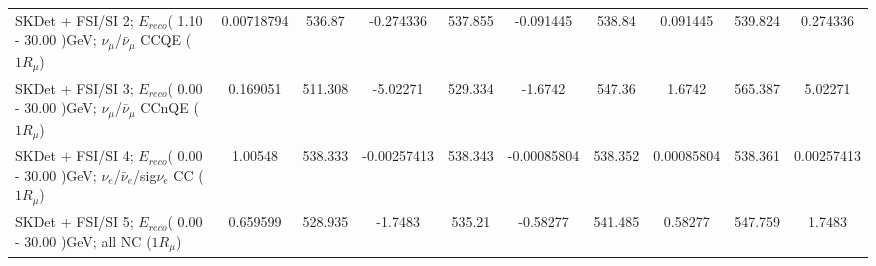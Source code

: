 \documentclass{standalone}
\begin{document}
\begin{tabular}{| l | S | S  S | S  S | S  S | S  S | }
SKDet + FSI/SI  2; $E_{reco}$( 1.10 - 30.00 )GeV; $\nu_{\mu}$/$\bar{\nu}_{\mu}$ CCQE ($1R_{\mu}$) &      0.00718794 &          536.87 &       -0.274336 &         537.855 &       -0.091445 &          538.84 &        0.091445 &         539.824 &        0.274336 \\ 
SKDet + FSI/SI  3; $E_{reco}$( 0.00 - 30.00 )GeV; $\nu_{\mu}$/$\bar{\nu}_{\mu}$ CCnQE ($1R_{\mu}$) &        0.169051 &         511.308 &        -5.02271 &         529.334 &         -1.6742 &          547.36 &          1.6742 &         565.387 &         5.02271 \\ 
SKDet + FSI/SI  4; $E_{reco}$( 0.00 - 30.00 )GeV; $\nu_{e}$/$\bar{\nu}_{e}$/sig$\nu_{e}$ CC ($1R_{\mu}$) &         1.00548 &         538.333 &     -0.00257413 &         538.343 &     -0.00085804 &         538.352 &      0.00085804 &         538.361 &      0.00257413 \\ 
           SKDet + FSI/SI  5; $E_{reco}$( 0.00 - 30.00 )GeV; all NC ($1R_{\mu}$) &        0.659599 &         528.935 &         -1.7483 &          535.21 &        -0.58277 &         541.485 &         0.58277 &         547.759 &          1.7483 \\ 
\bottomrule
\end{tabular}
\end{document}
